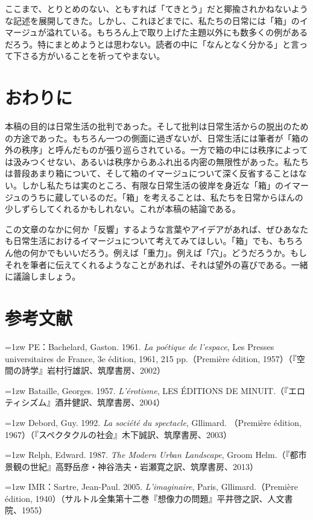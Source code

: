 \documentclass[b5j,twoside,twocolumn]{utarticle}
\begin{document}
ここまで、とりとめのない、ともすれば「てきとう」だと揶揄されかねないような記述を展開してきた。しかし、これほどまでに、私たちの日常には「箱」のイマージュが溢れている。もちろん上で取り上げた主題以外にも数多くの例があるだろう。特にまとめようとは思わない。読者の中に「なんとなく分かる」と言って下さる方がいることを祈ってやまない。


\section{おわりに}
本稿の目的は日常生活の批判であった。そして批判は日常生活からの脱出のための方途であった。もちろん一つの側面に過ぎないが、日常生活には筆者が「箱の外の秩序」と呼んだものが張り巡らされている。一方で箱の中には秩序によっては汲みつくせない、あるいは秩序からあふれ出る内密の無限性があった。私たちは普段あまり箱について、そして箱のイマージュについて深く反省することはない。しかし私たちは実のところ、有限な日常生活の彼岸を身近な「箱」のイマージュのうちに蔵しているのだ。「箱」を考えることは、私たちを日常からほんの少しずらしてくれるかもしれない。これが本稿の結論である。


この文章のなかに何か「反響」するような言葉やアイデアがあれば、ぜひあなたも日常生活におけるイマージュについて考えてみてほしい。「箱」でも、もちろん他の何かでもいいだろう。例えば「重力」。例えば「穴」。どうだろうか。もしそれを筆者に伝えてくれるようなことがあれば、それは望外の喜びである。一緒に議論しましょう。

\section*{参考文献}
\hangindent=1zw
\noindent PE：Bachelard, Gaston. 1961.\textsl{ La poétique de l'espace}, Les Presses universitaires de France, 3e édition, 1961, 215 pp.（Première édition, 1957）（『空間の詩学』岩村行雄訳、筑摩書房、2002）

\hangindent=1zw
\noindent Bataille, Georges. 1957. \textsl{L'érotisme}, LES ÉDITIONS DE MINUIT.（『エロティシズム』酒井健訳、筑摩書房、2004）

\hangindent=1zw
\noindent Debord, Guy. 1992. \textsl{La société du spectacle}, Gllimard. （Première édition, 1967）（『スペクタクルの社会』木下誠訳、筑摩書房、2003）

\hangindent=1zw
\noindent Relph, Edward. 1987. \textsl{The Modern Urban Landscape}, Groom Helm.（『都市景観の世紀』高野岳彦・神谷浩夫・岩瀬寛之訳、筑摩書房、2013）

\hangindent=1zw
\noindent IMR：Sartre, Jean-Paul. 2005. \textsl{L'imaginaire}, Paris, Gllimard.（Première édition, 1940）（サルトル全集第十二巻『想像力の問題』平井啓之訳、人文書院、1955）
\end{document}
